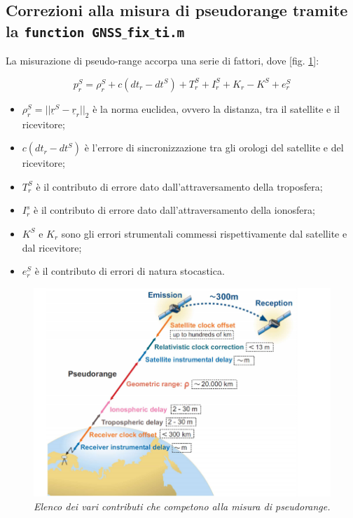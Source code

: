 \documentclass[a4paper,11pt,twoside]{book}
\begin{document}
	\subsection{Correzioni alla misura di pseudorange tramite la \texttt{function GNSS$\_$fix$\_$ti.m}}
	 
	La misurazione di pseudo-range accorpa una serie di fattori, dove [fig. \ref{fig:pseudo1}]:
	
	\begin{equation}
		p^S_r = \rho^S_r + c (dt_r - dt^S) + T^S_r + I^S_r + K_r - K^S + e^S_r
	\end{equation}

	\begin{itemize}[-]
		\item $\rho^S_r = || \underline{r}^S - \underline{r}_r ||_2 $ è la norma euclidea, ovvero la distanza, tra il satellite e il ricevitore;
		
		\item $c (dt_r - dt^S)$ è l'errore di sincronizzazione tra gli orologi del satellite e del ricevitore;
		
		\item $T^S_r$ è il contributo di errore dato dall'attraversamento della troposfera;
		
		\item $I^s_r$ è il contributo di errore dato dall'attraversamento della ionosfera;
		
		\item $K^S$ e $K_r$ sono gli errori strumentali commessi rispettivamente dal satellite e dal ricevitore;
		
		\item $e^S_r$ è il contributo di errori di natura stocastica.
	\end{itemize}

	\begin{figure}[H]
		\centering
		\includegraphics[scale=0.6]{"Immagini workbook/Immagini esp3/pseudo1"}
		\caption{\textit{Elenco dei vari contributi che competono alla misura di pseudorange.}}
		\label{fig:pseudo1}
	\end{figure}
	
\end{document}
